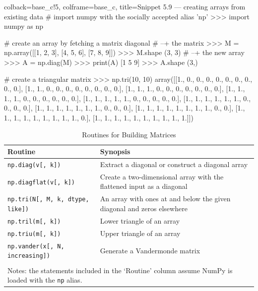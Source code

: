 \documentclass[a4paper,11pt]{book}
\begin{document}
\begin{pythoncode}[linenos=true,]{colback=base_c!5, colframe=base_c, title=\sffamily Snippet 5.9 --- creating arrays from existing data}
# import numpy with the socially accepted alias 'np'
>>> import numpy as np

# create an array by fetching a matrix diagonal 
# --+ the matrix 
>>> M = np.array([[1, 2, 3], [4, 5, 6], [7, 8, 9]])
>>> M.shape
(3, 3)
# --+ the new array 
>>> A = np.diag(M)
>>> print(A)
[1 5 9]
>>> A.shape
(3,)

# create a triangular matrix
>>> np.tri(10, 10)
array([[1., 0., 0., 0., 0., 0., 0., 0., 0., 0.],
       [1., 1., 0., 0., 0., 0., 0., 0., 0., 0.],
       [1., 1., 1., 0., 0., 0., 0., 0., 0., 0.],
       [1., 1., 1., 1., 0., 0., 0., 0., 0., 0.],
       [1., 1., 1., 1., 1., 0., 0., 0., 0., 0.],
       [1., 1., 1., 1., 1., 1., 0., 0., 0., 0.],
       [1., 1., 1., 1., 1., 1., 1., 0., 0., 0.],
       [1., 1., 1., 1., 1., 1., 1., 1., 0., 0.],
       [1., 1., 1., 1., 1., 1., 1., 1., 1., 0.],
       [1., 1., 1., 1., 1., 1., 1., 1., 1., 1.]])
\end{pythoncode}

\begin{table}
	\centering
	\caption{Routines for Building Matrices}
	\label{tab:array_for_building_matrices}
	\begin{tabular}{lp{12cm}}
		\toprule \toprule
			Routine & Synopsis \\
			\midrule
			\texttt{np.diag(v[, k])}
			&Extract a diagonal or construct a diagonal array \\
			\texttt{np.diagflat(v[, k])}
			&Create a two-dimensional array with the flattened input as a diagonal\\
		        \texttt{np.tri(N[, M, k, dtype, like])}
			&An array with ones at and below the given diagonal and zeros elsewhere\\
			\texttt{np.tril(m[, k])}
			&Lower triangle of an array\\
			\texttt{np.triu(m[, k])}
			&Upper triangle of an array\\
			\texttt{np.vander(x[, N, increasing])}
			&Generate a Vandermonde matrix\\
			\bottomrule \\[-1.8ex]
			\multicolumn{2}{l}{Notes: the statements included in the `Routine' column assume NumPy is loaded with the \texttt{np} alias.} \\
	\end{tabular}
\end{table}
\clearpage
\end{document}
